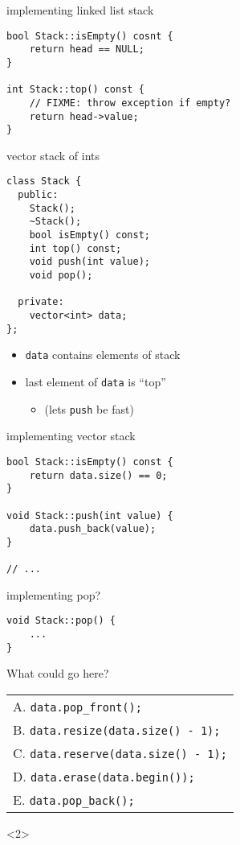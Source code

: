 \begin{frame}[fragile,label=implLLStack]{implementing linked list stack}
\lstset{language=C++,style=small}
\begin{lstlisting}
bool Stack::isEmpty() cosnt {
    return head == NULL;
}

int Stack::top() const {
    // FIXME: throw exception if empty?
    return head->value;
}
\end{lstlisting}
\end{frame}

\begin{frame}[fragile,label=vectorStack]{vector stack of ints}
\lstset{language=C++,style=smaller}
\begin{lstlisting}
class Stack {
  public:
    Stack();
    ~Stack();
    bool isEmpty() const;
    int top() const;
    void push(int value);
    void pop();

  private:
    vector<int> data;
};
\end{lstlisting}
\begin{itemize}
\item \texttt{data} contains elements of stack
\item last element of \texttt{data} is ``top''
    \begin{itemize}
    \item (lets \texttt{push} be fast)
    \end{itemize}
\end{itemize}
\end{frame}

\begin{frame}[fragile,label=vectorStackImpl]{implementing vector stack}
\lstset{language=C++,style=small}
\begin{lstlisting}
bool Stack::isEmpty() const {
    return data.size() == 0;
}

void Stack::push(int value) {
    data.push_back(value);
}

// ...
\end{lstlisting}
\end{frame}

\begin{frame}[fragile,label=vectorStackImplPop]{implementing pop?}
\lstset{language=C++,style=small}
\begin{lstlisting}
void Stack::pop() {
    ...
}
\end{lstlisting}
What could go here? \\
    \begin{tabular}{l}
        A. \lstinline|data.pop_front();| \\
        B. \lstinline|data.resize(data.size() - 1);| \\
        C. \lstinline|data.reserve(data.size() - 1);| \\
        D. \lstinline|data.erase(data.begin());| \\
        E. \lstinline|data.pop_back();| \\
    \end{tabular}
\begin{visibleenv}<2>
\iftoggle{heldback}{}{
\\
\myemph{B or E}
}
\end{visibleenv}
\end{frame}

